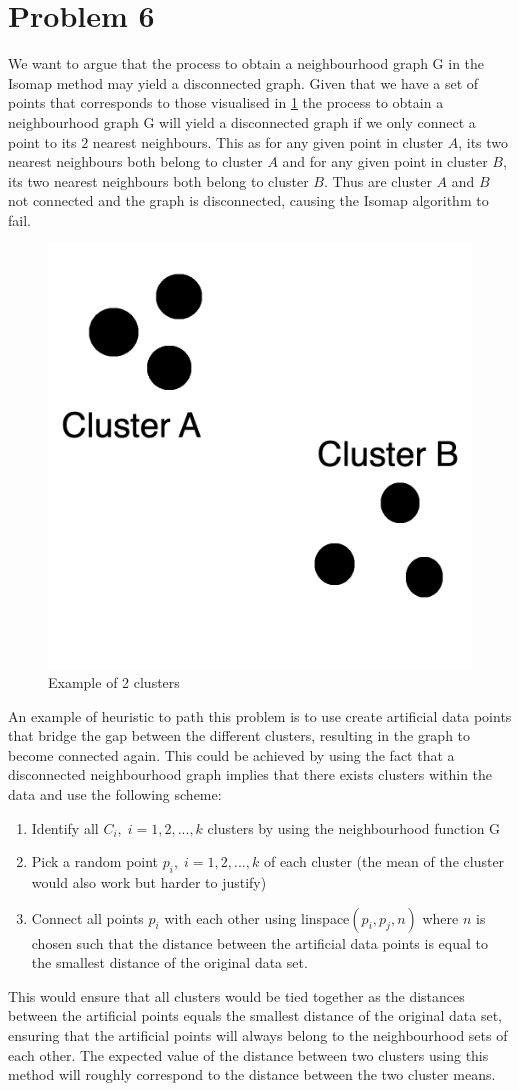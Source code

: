 \section*{Problem 6}
We want to argue that the process to obtain a neighbourhood graph G in the Isomap method may yield a disconnected graph. Given that we have a set of points that corresponds to those visualised in \ref{cluster} the process to obtain a neighbourhood graph G will yield a disconnected graph if we only connect a point to its $2$ nearest neighbours. This as for any given point in cluster $A$, its two nearest neighbours both belong to cluster $A$ and for any given point in cluster $B$, its two nearest neighbours both belong to cluster $B$. Thus are cluster $A$ and $B$ not connected and the graph is disconnected, causing the Isomap algorithm to fail.

\begin{figure}[H]
  \centering
  \includegraphics[width = 0.5\linewidth]{clusters_problem_6.png}
  \caption{Example of 2 clusters}
  \label{cluster}
\end{figure}


An example of heuristic to path this problem is to use create artificial data points that bridge the gap between the different clusters, resulting in the graph to become connected again. This could be achieved by using the fact that a disconnected neighbourhood graph implies that there exists clusters within the data and use the following scheme:

\begin{enumerate}
  \item Identify all $C_i, \; i = 1,2,...,k$ clusters by using the neighbourhood function G
  \item Pick a random point $p_i, \; i = 1,2,...,k$ of each cluster (the mean of the cluster would also work but harder to justify)
  \item Connect all points $p_i$ with each other using linspace$(p_i,p_j,n)$ where $n$ is chosen such that the distance between the artificial data points is equal to the smallest distance of the original data set.
\end{enumerate}

This would ensure that all clusters would be tied together as the distances between the artificial points equals the smallest distance of the original data set, ensuring that the artificial points will always belong to the neighbourhood sets of each other. The expected value of the distance between two clusters using this method will roughly correspond to the distance between the two cluster means. 

